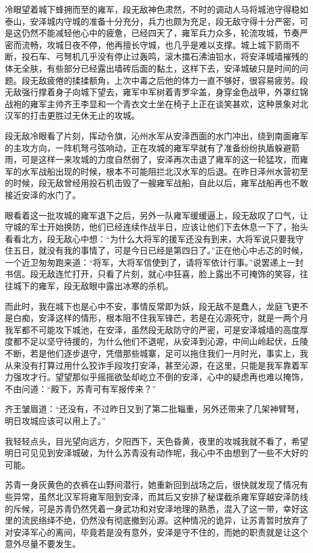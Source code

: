 冷眼望着城下蜂拥而至的雍军，段无敌神色肃然，不时的调动人马将城池守得稳如泰山，安泽城内守城的准备十分充分，兵力也颇为充足，段无敌守得十分严密，可是这仍然不能减轻他心中的疲惫，已经四天了，雍军兵力众多，轮流攻城，节奏严密而流畅，攻城日夜不停，他再擅长守城，也几乎是难以支撑。城上城下箭雨不断，投石车、弓弩机几乎没有停止过轰鸣，滚木擂石沸油铅水，将安泽城墙摧残的体无全肤，有些部分已经露出墙砖后面的黏土，这样下去，安泽城破只是时间的问题。段无敌疲倦的揉揉额角，上次中毒之后他的体力一直不够好，很容易疲劳。段无敌强行撑着身子向城下望去，雍军中军树着青罗伞盖，身穿金色战甲，外罩红锦战袍的雍军主帅齐王李显和一个青衣文士坐在椅子上正在谈笑甚欢，这种景象对北汉军的打击更胜过无休无止的攻城。

段无敌冷眼看了片刻，挥动令旗，沁州水军从安泽西面的水门冲出，绕到南面雍军的主攻方向，一阵机弩弓弦响动，正在攻城的雍军早就有了准备纷纷执盾躲避箭雨，可是这样一来攻城的力度自然弱了，安泽再次击退了雍军的这一轮猛攻，而雍军的水军战船出现的时候，根本不可能阻拦北汉水军的后退。在昨日泽州水营初至的时候，段无敌曾经用投石机击毁了一艘雍军战船，自此以后，雍军战船再也不敢接近安泽的水门了。

眼看着这一批攻城的雍军退下之后，另外一队雍军缓缓逼上，段无敌叹了口气，让守城的军士开始换防，他们已经连续作战半日，应该让他们下去休息一下了，抬头看看北方，段无敌心中想：“为什么大将军的援军还没有到来，大将军说只要我守住五日，就没有我的事情了，可是今日已经是第四日了。”正在他心中忐忑的时候，一个近卫匆匆跑来道：“将军，大将军信使到了，请将军依计行事。”说罢递上一封书信。段无敌连忙打开，只看了片刻，就心中狂喜，脸上露出不可掩饰的笑容，往往城下的雍军，段无敌眼中露出冰寒的杀机。

而此时，我在城下也是心中不安，事情反常即为妖，段无敌不是蠢人，龙庭飞更不是白痴，安泽这样的情形，根本阻不住我军锋芒，若是在沁源死守，就是一两个月我军都不可能攻下城池，在安泽，虽然段无敌防守的严密，可是安泽城墙的高度厚度都不足以坚守待援的，为什么他们不退呢，从安泽到沁源，中间山岭起伏，丘陵不断，若是他们逐步退守，凭借那些城寨，足可以拖住我们一月时光，事实上，我从来没有打算过用什么狡诈手段攻打安泽，甚至沁源，在这里，只能是我军靠着军力强攻才行。望望那似乎摇摇欲坠却屹立不倒的安泽，心中的疑虑再也难以掩饰，不由问道：“殿下，苏青可有军报传来？”

齐王皱眉道：“还没有，不过昨日又到了第二批辎重，另外还带来了几架神臂弩，明日攻城应该可以用上了。”

我轻轻点头，目光望向远方，夕阳西下，天色昏黄，夜里的攻城我就不看了，希望明日可见见到安泽城破，为什么苏青没有动作呢，我心中不由想到了一些不大好的可能。

苏青一身灰黄色的衣裤在山野间潜行，她重新回到战场之后，很快就发现了情况有些异常，虽然北汉军将雍军阻到安泽，而其后又安排了秘谍截杀雍军穿越安泽防线的斥候，可是苏青仍然凭着一身武功和对安泽地理的熟悉，混入了这一带，幸好这里的流民络绎不绝，仍然没有彻底撤到沁源。这种情况的诡异，让苏青暂时放弃了对安泽军心的离间，毕竟若是没有意外，安泽是守不住的，而她的职责就是让这个意外尽量不要发生。

